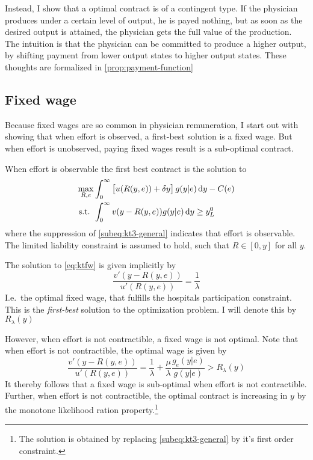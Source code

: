 	Instead, I show that a optimal contract is of a contingent type. If the physician produces under a certain level of output, he is payed nothing, but as soon as the desired output is attained, the physician gets the full value of the production. The intuition is that the physician can be committed to produce a higher output, by shifting payment from lower output states to higher output states. These thoughts are formalized in \cref{prop:payment-function}
				
	\subsection{Fixed wage} %
	\label{sub:fixed_wage}
	Because fixed wages are so common in physician remuneration, I start out with showing that when effort is observed, a first-best solution is a fixed wage. But when effort is unobserved, paying fixed wages result is a sub-optimal contract. 
				
	When effort is observable the first best contract is the solution to 
	\begin{subequations}
		\label{eq:ktfw}
		\begin{align}
			\max_{R,e}   & \int_0^{\infty}\left[u(R(y,e))+\delta y\right]g(y|e)\dif y-C(e) \\
			\text{s.t. } & \int_{0}^{\infty} v(y-R(y,e))g(y|e)\dif y\geq y_L^0             
		\end{align}
	\end{subequations}
	where the suppression of \cref{subeq:kt3-general} indicates that effort is observable. The limited liability constraint is assumed to hold, such that  $R\in[0,y]$ for all $y$. 
				
	The solution to \cref{eq:ktfw} is given implicitly by 
	\[
		\frac{v'(y-R(y,e))}{u'(R(y,e))}=\frac{1}{\lambda}
	\]
	I.e.\ the optimal fixed wage, that fulfills the hospitals participation constraint. This is the \emph{first-best} solution to the optimization problem. I will denote this by $R_\lambda(y)$
				
	However, when effort is not contractible, a fixed wage is not optimal. Note that when effort is not contractible, the optimal wage is given by 
	\[
		\frac{v'(y-R(y,e))}{u'(R(y,e))}=\frac{1}{\lambda}+\frac{\mu}{\lambda}\frac{g_e(y|e)}{g(y|e)}>R_\lambda(y)
	\]
	It thereby follows that a fixed wage is sub-optimal when effort is not contractible. Further, when effort is not contractible, the optimal contract is increasing in $y$ by the monotone likelihood ration property.\footnote{The solution is obtained by replacing \cref{subeq:kt3-general} by it's first order constraint.}
				
